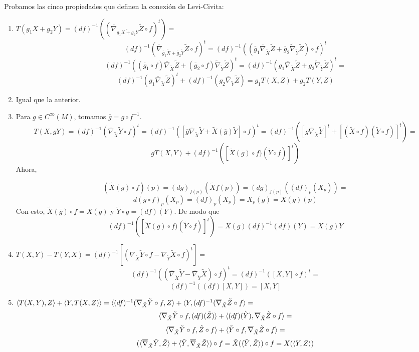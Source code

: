 \documentclass[GSR.tex]{subfiles}
\begin{document}
Probamos las cinco propiedades que definen la conexión de Levi-Civita:
\begin{enumerate}
\item $T(g_1X+g_2Y)=(df)^{-1}((\overline{\nabla}_{\widetilde{g_1X+g_2Y}}\tilde{Z}\circ f)^t)=$
$$(df)^{-1}(\overline{\nabla}_{\overline{g}_1\tilde{X}+\overline{g}_2\tilde{Y}}\tilde{Z}\circ f)^t=(df)^{-1}((\overline{g}_1\overline{\nabla}_{\tilde{X}}\tilde{Z}+\overline{g}_2\tilde{\nabla}_{\tilde{Y}}\tilde{Z})\circ f)^t $$
$$(df)^{-1}((\overline{g}_1\circ f)\overline{\nabla}_{\tilde{X}}\tilde{Z}+(\overline{g}_2\circ f)\tilde{\nabla}_{\tilde{Y}}\tilde{Z})^t=(df)^{-1}(g_1\overline{\nabla}_{\tilde{X}}\tilde{Z}+g_2\tilde{\nabla}_{\tilde{Y}}\tilde{Z})^t=$$
$$(df)^{-1}(g_1\overline{\nabla}_{\tilde{X}}\tilde{Z})^t+(df)^{-1}(g_2\overline{\nabla}_{\tilde{Y}}\tilde{Z})=g_1T(X,Z)+g_2T(Y,Z)$$

\item Igual que la anterior.
\item Para $g\in C^{\infty}(M)$, tomamos $\overline{g}=g\circ f^{-1}$. 
$$T(X,gY)=(df)^{-1}(\overline{\nabla}_{\tilde{X}}\tilde{Y}\circ f)^t=(df)^{-1}([\overline{g}\overline{\nabla}_{\tilde{X}}\tilde{Y}+\tilde{X}(\overline{g})\tilde{Y}]\circ f)^t=(df)^{-1}([g\overline{\nabla}_{\tilde{X}}\tilde{Y}]^t+[(\tilde{X}\circ f)(\tilde{Y}\circ  f)]^t)=$$
$$gT(X,Y)+(df)^{-1}([\tilde{X}(\overline{g})\circ f)(\tilde{Y}\circ f)]^t)$$
Ahora, 

$$(\tilde{X}(\overline{g})\circ f)(p)=(d\overline{g})_{f(p)}(\tilde{X}f(p))=(d\overline{g})_{f(p)}((df)_p(X_p))=$$
$$d(\overline{g}\circ f)_p(X_p)=(df)_p(X_p)=X_p(g)=X(g)(p)$$
Con esto, $\tilde{X}(\overline{g})\circ f=X(g)$ y $\tilde{Y}\circ g=(df)(Y)$. De modo que 
$$(df)^{-1}([\tilde{X}(\overline{g})\circ f)(\tilde{Y}\circ f)]^t)=X(g)(df)^{-1}(df)(Y)=X(g)Y$$
\item $T(X,Y)-T(Y,X)=(df)^{-1}[(\overline{\nabla}_{\tilde{X}}\tilde{Y}\circ f-\overline{\nabla}_{\tilde{Y}}\tilde{X}\circ f)^t]=$
$$(df)^{-1}((\overline{\nabla}_{\tilde{X}}\tilde{Y}-\overline{\nabla}_{\tilde{Y}}\tilde{X})\circ f)^t=(df)^{-1}([X,Y]\circ f)^t=$$
$$(df)^{-1}((df)[X,Y])=[X,Y]$$
\item  $\langle{T(X,Y),Z}\rangle+\langle{Y,T(X,Z)}\rangle=\langle{(df)^{-1}(\overline{\nabla}_{\tilde{X}}\tilde{Y}\circ f,Z}\rangle+\langle{Y,(df)^{-1}(\overline{\nabla}_{\tilde{X}}\tilde{Z}\circ f}\rangle=$
$$\langle{\overline{\nabla}_{\tilde{X}}\tilde{Y}\circ f,(df)(\tilde{Z})}\rangle+\langle{(df)(\tilde{Y}),\overline{\nabla}_{\tilde{X}}\tilde{Z}\circ f}\rangle=$$
$$\langle{\overline{\nabla}_{\tilde{X}}\tilde{Y}\circ f,\tilde{Z}\circ f}\rangle+\langle{\tilde{Y}\circ f,\overline{\nabla}_{\tilde{X}}\tilde{Z}\circ f}\rangle=$$
$$(\langle{\overline{\nabla}_{\tilde{X}}\tilde{Y},\tilde{Z}}\rangle+\langle{\tilde{Y},\overline{\nabla}_{\tilde{X}}\tilde{Z}}\rangle)\circ f=\tilde{X}(\langle{\tilde{Y},\tilde{Z}}\rangle)\circ f=X(\langle{Y,Z}\rangle)$$
\end{enumerate}
\end{document}
